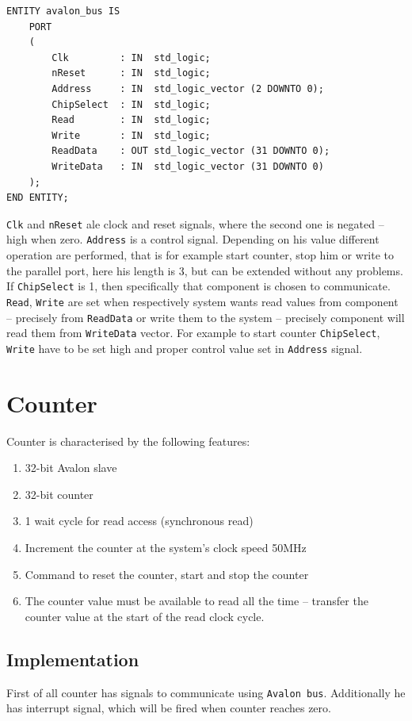 \begin{verbatim}
ENTITY avalon_bus IS
    PORT
    (
        Clk         : IN  std_logic;
        nReset      : IN  std_logic;
        Address     : IN  std_logic_vector (2 DOWNTO 0);
        ChipSelect  : IN  std_logic;
        Read        : IN  std_logic;
        Write       : IN  std_logic;
        ReadData    : OUT std_logic_vector (31 DOWNTO 0);
        WriteData   : IN  std_logic_vector (31 DOWNTO 0)
    );
END ENTITY;
\end{verbatim}

\verb|Clk| and \verb|nReset| ale clock and reset signals, where the second one is negated -- high when zero. \verb|Address| is a control signal. Depending on his value different operation are performed, that is for example start counter, stop him or write to the parallel port, here his length is 3, but can be extended without any problems. If \verb|ChipSelect| is 1, then specifically that component is chosen to communicate. \verb|Read|, \verb|Write| are set when respectively system wants read values from component -- precisely from \verb|ReadData| or write them to the system -- precisely component will read them from \verb|WriteData| vector. For example to start counter \verb|ChipSelect|, \verb|Write| have to be set high and proper control value set in \verb|Address| signal.

\section{Counter} \label{sec:counter}
Counter is characterised by the following features:
\begin{enumerate}
  \item 32-bit Avalon slave
  \item 32-bit counter
  \item 1 wait cycle for read access (synchronous read)
  \item Increment the counter at the system's clock speed 50MHz
  \item Command to reset the counter, start and stop the counter
  \item The counter value must be available to read all the time -- transfer the counter value at the start of the read clock cycle.
\end{enumerate}

\subsection{Implementation}
First of all counter has signals to communicate using \verb|Avalon bus|. Additionally he has interrupt signal, which will be fired when counter reaches zero. 


